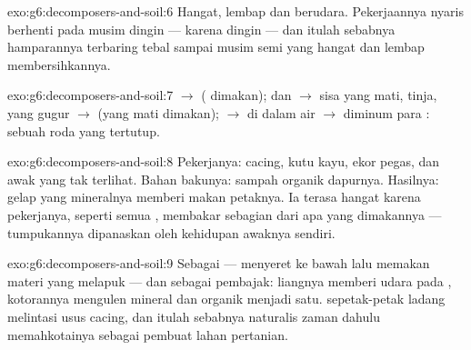 \begin{solution}{exo:g6:decomposers-and-soil:6}
Hangat, lembap dan berudara. Pekerjaannya nyaris berhenti pada musim
dingin --- karena dingin --- dan itulah sebabnya hamparannya
terbaring tebal sampai musim semi yang hangat dan lembap
membersihkannya.
\end{solution}

\begin{solution}{exo:g6:decomposers-and-soil:7}
 $\rightarrow$  ( dimakan);  dan
 $\rightarrow$ sisa yang mati, tinja,  yang gugur
$\rightarrow$  (yang mati dimakan);  $\rightarrow$
 di dalam air  $\rightarrow$ diminum para
: sebuah roda yang tertutup.
\end{solution}

\begin{solution}{exo:g6:decomposers-and-soil:8}
Pekerjanya: cacing, kutu kayu, ekor pegas,  dan awak yang tak
terlihat. Bahan bakunya: sampah organik dapurnya. Hasilnya: 
gelap yang mineralnya memberi makan petaknya. Ia terasa hangat karena
pekerjanya, seperti semua , membakar sebagian dari apa yang
dimakannya --- tumpukannya dipanaskan oleh kehidupan awaknya sendiri.
\end{solution}

\begin{solution}{exo:g6:decomposers-and-soil:9}
Sebagai  --- menyeret  ke bawah  lalu memakan materi
yang melapuk --- dan sebagai pembajak: liangnya memberi udara pada
, kotorannya mengulen mineral dan organik menjadi satu. 
sepetak-petak ladang melintasi usus cacing, dan itulah sebabnya
naturalis zaman dahulu memahkotainya sebagai pembuat lahan pertanian.
\end{solution}

